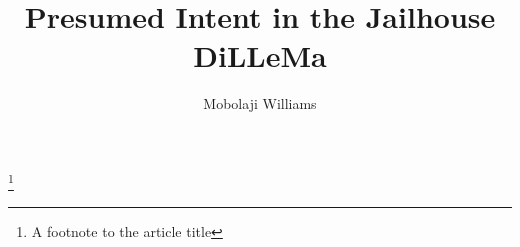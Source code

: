 \documentclass[%
 reprint,
 amsmath,amssymb,
 aps,
]{revtex4-2}
\begin{document}

\title{Presumed Intent in the Jailhouse DiLLeMa}
\thanks{A footnote to the article title}%

\author{Mobolaji Williams}



\end{document}
